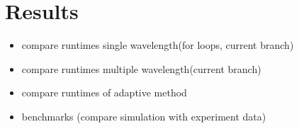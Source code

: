 \section{Results}
	\begin{itemize}
	\item compare runtimes single wavelength(for loops, current branch)
	\item compare runtimes multiple wavelength(current branch)
	\item compare runtimes of adaptive method
        \item benchmarks (compare simulation with experiment data)
	\end{itemize}
